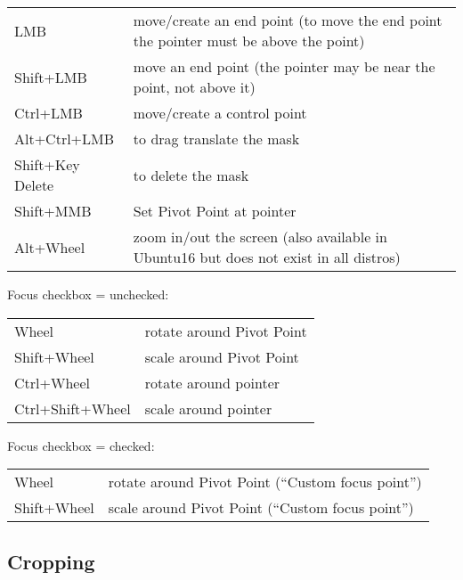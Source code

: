 \vspace{2ex}
\begin{tabular}{lp{11cm}}
    \hline			
    LMB & move/create an end point (to move the end point the pointer must be above the point) \\
    Shift+LMB & move an end point (the pointer may be near the point, not above it) \\
    Ctrl+LMB & move/create a control point \\
    Alt+Ctrl+LMB & to drag translate the mask \\
    Shift+Key Delete & to delete the mask \\
    Shift+MMB & Set Pivot Point at pointer \\
    Alt+Wheel & zoom in/out the screen (also available in Ubuntu16 but does not exist in all distros) \\
    \hline  
\end{tabular}

\vspace{2ex}
Focus checkbox = unchecked:

\vspace{2ex}
\begin{tabular}{ll}
    \hline			
    Wheel & rotate around Pivot Point \\
    Shift+Wheel & scale around Pivot Point \\
    Ctrl+Wheel & rotate around pointer \\
    Ctrl+Shift+Wheel & scale around pointer \\
    
    \hline  
\end{tabular}

\vspace{2ex}
Focus checkbox = checked:

\vspace{2ex}
\begin{tabular}{ll}
    \hline			
    Wheel & rotate around Pivot Point (“Custom focus point”) \\
    Shift+Wheel & scale around Pivot Point (“Custom focus point”) \\       
    \hline  
\end{tabular}

\vspace{2ex}

\subsection{Cropping}%
\label{sub:cropping}

